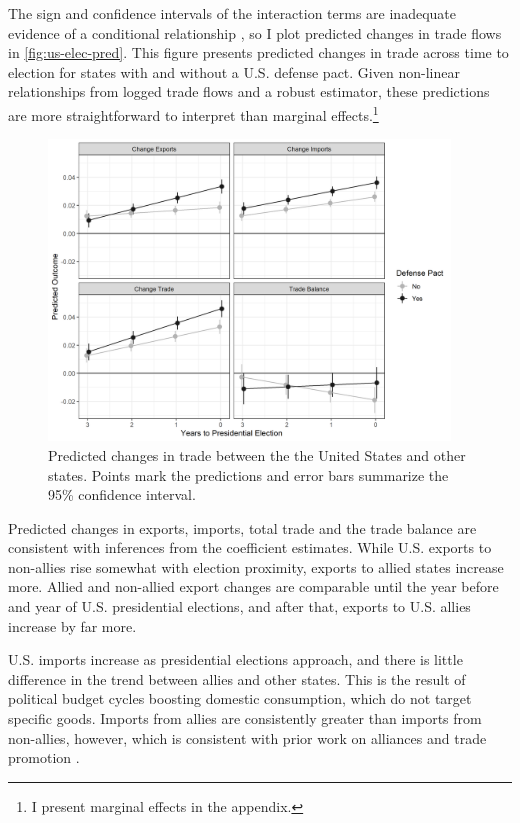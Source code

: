 \documentclass[12pt]{article}
\begin{document}
The sign and confidence intervals of the interaction terms are inadequate evidence of a conditional relationship \citep{BramborClarkGolder2006}, so I plot predicted changes in trade flows in \autoref{fig:us-elec-pred}.
This figure presents predicted changes in trade across time to election for states with and without a U.S. defense pact. 
Given non-linear relationships from logged trade flows and a robust estimator, these predictions are more straightforward to interpret than marginal effects.\footnote{I present marginal effects in the appendix.} 


\begin{figure}[htpb]
	\centering
		\includegraphics[width=0.95\textwidth]{../figures/us-elec-pred.png}
	\caption{Predicted changes in trade between the the United States and other states. Points mark the predictions and error bars summarize the 95\% confidence interval.}
	\label{fig:us-elec-pred}
\end{figure}


Predicted changes in exports, imports, total trade and the trade balance are consistent with inferences from the coefficient estimates. 
While U.S. exports to non-allies rise somewhat with election proximity, exports to allied states increase more. 
Allied and non-allied export changes are comparable until the year before and year of U.S. presidential elections, and after that, exports to U.S. allies increase by far more. 


U.S. imports increase as presidential elections approach, and there is little difference in the trend between allies and other states. 
This is the result of political budget cycles boosting domestic consumption, which do not target specific goods.
Imports from allies are consistently greater than imports from non-allies, however, which is consistent with prior work on alliances and trade promotion \citep{GowaMansfield2004}. 
\end{document}
